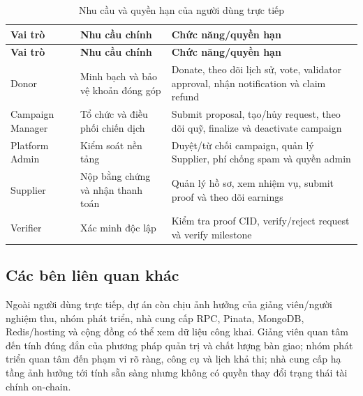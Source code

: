 \begin{longtable}{| p{3cm} | p{4.2cm} | p{7cm} |}
\caption{Nhu cầu và quyền hạn của người dùng trực tiếp}\label{tab:user-roles}\\
\hline
\textbf{Vai trò} & \textbf{Nhu cầu chính} & \textbf{Chức năng/quyền hạn} \\
\hline
\endfirsthead
\hline
\textbf{Vai trò} & \textbf{Nhu cầu chính} & \textbf{Chức năng/quyền hạn} \\
\hline
\endhead
Donor & Minh bạch và bảo vệ khoản đóng góp & Donate, theo dõi lịch sử, vote, validator approval, nhận notification và claim refund \\ \hline
Campaign Manager & Tổ chức và điều phối chiến dịch & Submit proposal, tạo/hủy request, theo dõi quỹ, finalize và deactivate campaign \\ \hline
Platform Admin & Kiểm soát nền tảng & Duyệt/từ chối campaign, quản lý Supplier, phí chống spam và quyền admin \\ \hline
Supplier & Nộp bằng chứng và nhận thanh toán & Quản lý hồ sơ, xem nhiệm vụ, submit proof và theo dõi earnings \\ \hline
Verifier & Xác minh độc lập & Kiểm tra proof CID, verify/reject request và verify milestone \\
\hline
\end{longtable}

\subsection{Các bên liên quan khác}

Ngoài người dùng trực tiếp, dự án còn chịu ảnh hưởng của giảng viên/người nghiệm thu, nhóm phát triển, nhà cung cấp RPC, Pinata, MongoDB, Redis/hosting và cộng đồng có thể xem dữ liệu công khai. Giảng viên quan tâm đến tính đúng đắn của phương pháp quản trị và chất lượng bàn giao; nhóm phát triển quan tâm đến phạm vi rõ ràng, công cụ và lịch khả thi; nhà cung cấp hạ tầng ảnh hưởng tới tính sẵn sàng nhưng không có quyền thay đổi trạng thái tài chính on-chain.

